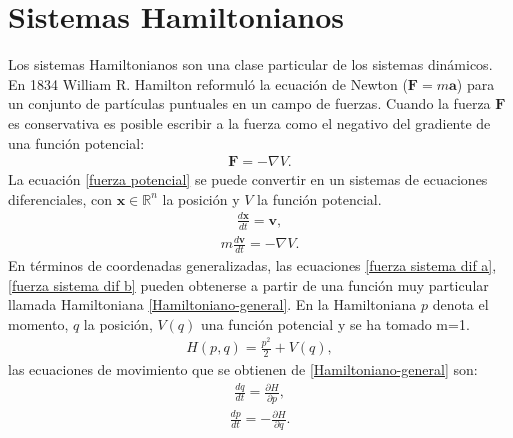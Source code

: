 \section{Sistemas Hamiltonianos}
Los sistemas Hamiltonianos son una clase particular de los sistemas dinámicos. En 1834 William R. Hamilton reformuló la ecuación de Newton ($\mathbf{F}=m\mathbf{a}$) para un conjunto de partículas puntuales en un campo de fuerzas. Cuando la fuerza $\mathbf{F}$ es conservativa es posible escribir a la fuerza como  el negativo del gradiente de una función potencial:
\begin{eqnarray}
\mathbf{F}=-\nabla V. \label{fuerza potencial}
\end{eqnarray}
La ecuación \eqref{fuerza potencial} se puede convertir en un sistemas de ecuaciones diferenciales, con $\mathbf{x} \in \mathbb{R}^{n}$ la posición y $V$ la función potencial.
\begin{eqnarray}
\frac{d\mathbf{x}}{dt}=\mathbf{v},
\label{fuerza sistema dif a}
\end{eqnarray}
\begin{eqnarray}
m\frac{d\mathbf{v}}{dt}=-\nabla V.
\label{fuerza sistema dif b}
\end{eqnarray}
En términos de coordenadas generalizadas, las ecuaciones \ref{fuerza sistema dif a},\ref{fuerza sistema dif b} pueden obtenerse a partir de una función muy particular llamada Hamiltoniana \ref{Hamiltoniano-general}. En la Hamiltoniana $p$ denota el momento, $q$ la posición, $V(q)$ una función potencial y se ha tomado m=1.
\begin{eqnarray}
H(p,q)=\frac{p^{2}}{2}+V(q),
\label{Hamiltoniano-general}
\end{eqnarray}
las ecuaciones de movimiento que se obtienen de \ref{Hamiltoniano-general} son:
\begin{eqnarray}
\frac{dq}{dt}=\frac{\partial H}{\partial p},
\label{1ec de mov}
\end{eqnarray}
\begin{eqnarray}
\frac{dp}{dt}=-\frac{\partial H}{\partial q}.
\label{2ec de mov}
\end{eqnarray}

